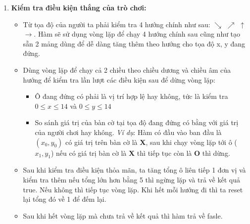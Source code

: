\begin{enumerate}[resume]
    \item \textbf{Kiểm tra điều kiện thắng của trò chơi:} 
    \begin{itemize}
        \item Từ tọa độ của người ta phải kiểm tra 4 hướng chính như sau: \(\searrow \) \(\nearrow\) \(\uparrow\) \(\to \). Hàm sẽ sử dụng vòng lặp để chạy 4 hướng chính sau cũng như tạo sẵn 2 mảng dùng để dễ dàng tăng thêm theo hướng cho tọa độ x, y đang đứng. 
        \item Dùng vòng lặp để chạy cả 2 chiều theo chiều dương và chiều âm của hướng để kiểm tra lần lượt các điều kiện sau để dừng vòng lặp:
        \begin{itemize}
            \item Ô đang đứng có phải là vị trí hợp lệ hay không, tức là kiểm tra \(0 \leq x \leq 14\) và \(0 \leq y \leq 14\)
            \item So sánh giá trị của bàn cờ tại tọa độ đang đứng có bằng với giá trị của người chơi hay không. \textit{Ví dụ}: Hàm có đầu vào ban đầu là \((x_0, y_0)\) có giá trị trên bàn cờ là \textbf{X}, sau khi chạy vòng lặp tới ô (\(x_1, y_1\)) nếu có giá trị bàn cờ là \textbf{X} thì tiếp tục còn là \textbf{O} thì dừng.
        \end{itemize}
        \item Sau khi kiểm tra điều kiện thỏa mãn, ta tăng tổng ô liên tiếp 1 đơn vị và kiểm tra thêm nếu tổng lớn hơn bằng 5 thì ngừng lặp và trả về kết quả true. Nếu không thì tiếp tục vòng lặp. Khi hết mỗi hướng đi thì ta reset lại tổng đó về 1 để đếm lại.
        \item Sau khi hết vòng lặp mà chưa trả về kết quả thì hàm trả về fasle. 
    \end{itemize}
\end{enumerate}


